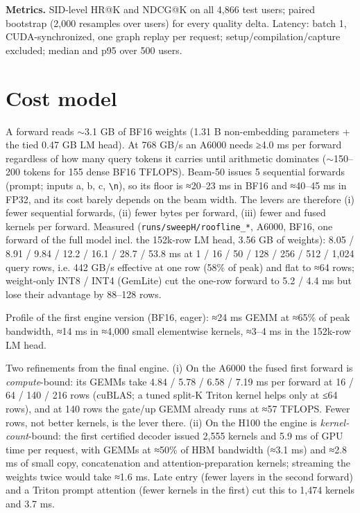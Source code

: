 \documentclass[11pt]{article}
\newcommand{\nl}{\texttt{\textbackslash n}}
\newcommand{\code}[1]{\texttt{#1}}
\begin{document}
\textbf{Metrics.} SID-level HR@K and NDCG@K on all 4,866 test users; paired bootstrap (2,000 resamples over users) for every quality delta. Latency: batch 1, CUDA-synchronized, one graph replay per request; setup/compilation/capture excluded; median and p95 over 500 users.

\section{Cost model}\label{sec:3}

A forward reads \ensuremath{\sim}3.1 GB of BF16 weights (1.31 B non-embedding parameters + the tied 0.47 GB LM head). At 768 GB/s an A6000 needs ≥4.0 ms per forward regardless of how many query tokens it carries until arithmetic dominates (\ensuremath{\sim}150–200 tokens for 155 dense BF16 TFLOPS). Beam-50 issues 5 sequential forwards (prompt; inputs a, b, c, \nl{}), so its floor is ≈20–23 ms in BF16 and ≈40–45 ms in FP32, and its cost barely depends on the beam width. The levers are therefore (i) fewer sequential forwards, (ii) fewer bytes per forward, (iii) fewer and fused kernels per forward. Measured (\code{runs/\allowbreak{}sweepH/\allowbreak{}roofline\_\allowbreak{}*}, A6000, BF16, one forward of the full model incl. the 152k-row LM head, 3.56 GB of weights): 8.05 / 8.91 / 9.84 / 12.2 / 16.1 / 28.7 / 53.8 ms at 1 / 16 / 50 / 128 / 256 / 512 / 1,024 query rows, i.e. 442 GB/s effective at one row (58\% of peak) and flat to ≈64 rows; weight-only INT8 / INT4 (GemLite) cut the one-row forward to 5.2 / 4.4 ms but lose their advantage by 88–128 rows.

Profile of the first engine version (BF16, eager): ≈24 ms GEMM at ≈65\% of peak bandwidth, ≈14 ms in ≈4,000 small elementwise kernels, ≈3–4 ms in the 152k-row LM head.

Two refinements from the final engine. (i) On the A6000 the fused first forward is \emph{compute}-bound: its GEMMs take 4.84 / 5.78 / 6.58 / 7.19 ms per forward at 16 / 64 / 140 / 216 rows (cuBLAS; a tuned split-K Triton kernel helps only at ≤64 rows), and at 140 rows the gate/up GEMM already runs at ≈57 TFLOPS. Fewer rows, not better kernels, is the lever there. (ii) On the H100 the engine is \emph{kernel-count}-bound: the first certified decoder issued 2,555 kernels and 5.9 ms of GPU time per request, with GEMMs at ≈50\% of HBM bandwidth (≈3.1 ms) and ≈2.8 ms of small copy, concatenation and attention-preparation kernels; streaming the weights twice would take ≈1.6 ms. Late entry (fewer layers in the second forward) and a Triton prompt attention (fewer kernels in the first) cut this to 1,474 kernels and 3.7 ms.
\end{document}

